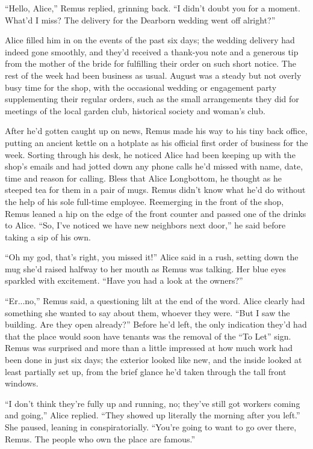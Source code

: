 “Hello, Alice,” Remus replied, grinning back. “I didn’t doubt you for a moment. What’d I miss? The delivery for the Dearborn wedding went off alright?”

Alice filled him in on the events of the past six days; the wedding delivery had indeed gone smoothly, and they’d received a thank-you note and a generous tip from the mother of the bride for fulfilling their order on such short notice. The rest of the week had been business as usual. August was a steady but not overly busy time for the shop, with the occasional wedding or engagement party supplementing their regular orders, such as the small arrangements they did for meetings of the local garden club, historical society and woman’s club.

After he’d gotten caught up on news, Remus made his way to his tiny back office, putting an ancient kettle on a hotplate as his official first order of business for the week. Sorting through his desk, he noticed Alice had been keeping up with the shop’s emails and had jotted down any phone calls he’d missed with name, date, time and reason for calling. Bless that Alice Longbottom, he thought as he steeped tea for them in a pair of mugs. Remus didn’t know what he’d do without the help of his sole full-time employee.
Reemerging in the front of the shop, Remus leaned a hip on the edge of the front counter and passed one of the drinks to Alice. “So, I’ve noticed we have new neighbors next door,” he said before taking a sip of his own.

“Oh my god, that’s right, you missed it!” Alice said in a rush, setting down the mug she’d raised halfway to her mouth as Remus was talking. Her blue eyes sparkled with excitement. “Have you had a look at the owners?”

“Er...no,” Remus said, a questioning lilt at the end of the word. Alice clearly had something she wanted to say about them, whoever they were. “But I saw the building. Are they open already?” Before he’d left, the only indication they’d had that the place would soon have tenants was the removal of the “To Let” sign. Remus was surprised and more than a little impressed at how much work had been done in just six days; the exterior looked like new, and the inside looked at least partially set up, from the brief glance he’d taken through the tall front windows.

“I don’t think they’re fully up and running, no; they’ve still got workers coming and going,” Alice replied. “They showed up literally the morning after you left.” She paused, leaning in conspiratorially. “You’re going to want to go over there, Remus. The people who own the place are famous.”

